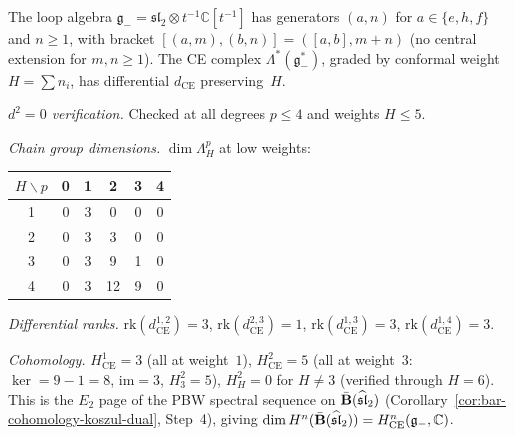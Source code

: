 \begin{computation}
\label{comp:sl2-ce-verification}
\ClaimStatusProvedHere
{}

The loop algebra
$\mathfrak{g}_- = \mathfrak{sl}_2 \otimes t^{-1}\mathbb{C}[t^{-1}]$
has generators $(a, n)$ for $a \in \{e, h, f\}$ and $n \geq 1$,
with bracket
$[(a, m), (b, n)] = ([a, b], m + n)$
(no central extension for $m, n \geq 1$).
The CE complex $\Lambda^*(\mathfrak{g}_-^*)$,
graded by conformal weight $H = \sum n_i$,
has differential $d_{\mathrm{CE}}$ preserving~$H$.

\emph{$d^2 = 0$ verification.}
Checked at all degrees $p \leq 4$ and weights $H \leq 5$.

\emph{Chain group dimensions.}
$\dim \Lambda^p_H$ at low weights:
\begin{center}
\renewcommand{\arraystretch}{1.1}
\begin{tabular}{c|ccccc}
$H \backslash p$ & 0 & 1 & 2 & 3 & 4 \\
\hline
1 & 0 & 3 & 0 & 0 & 0 \\
2 & 0 & 3 & 3 & 0 & 0 \\
3 & 0 & 3 & 9 & 1 & 0 \\
4 & 0 & 3 & 12 & 9 & 0
\end{tabular}
\end{center}

\emph{Differential ranks.}
$\mathrm{rk}(d^{1,2}_{\mathrm{CE}}) = 3$,
$\mathrm{rk}(d^{2,3}_{\mathrm{CE}}) = 1$,
$\mathrm{rk}(d^{1,3}_{\mathrm{CE}}) = 3$,
$\mathrm{rk}(d^{1,4}_{\mathrm{CE}}) = 3$.

\emph{Cohomology.}
$H^1_{\mathrm{CE}} = 3$ (all at weight~$1$),
$H^2_{\mathrm{CE}} = 5$ (all at weight~$3$:
$\ker = 9 - 1 = 8$, $\mathrm{im} = 3$, $H^2_3 = 5$),
$H^2_H = 0$ for $H \neq 3$ (verified through $H = 6$).
This is the $E_2$ page of the PBW spectral
sequence on $\bar{\mathbf{B}}(\widehat{\mathfrak{sl}}_2)$
(Corollary~\ref{cor:bar-cohomology-koszul-dual}, Step~4),
giving $\dim H^n(\bar{\mathbf{B}}(\widehat{\mathfrak{sl}}_2))
= H^n_{\mathrm{CE}}(\mathfrak{g}_-, \mathbb{C})$.


\end{computation}

